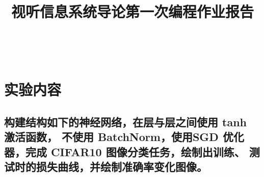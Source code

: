 \documentclass{article}%
\title{视听信息系统导论第一次编程作业报告}
\begin{document}
\begin{titlepage}
    \thispagestyle{empty}
    \vspace*{4cm} %
    \begin{center}
    {\LARGE \textbf{\thetitle}}\\
    \vspace{6cm}
    \end{center}
    \vspace*{\fill} %
\end{titlepage}

\setlength{\baselineskip}{22pt}
\tableofcontents
\clearpage



\section{实验内容}
\subsection{构建结构如下的神经网络，在层与层之间使用 tanh 激活函数，
不使用 BatchNorm，使用SGD 优化器，完成 CIFAR10 图像分类任务，绘制出训练、
测试时的损失曲线，并绘制准确率变化图像。}
\end{document}

